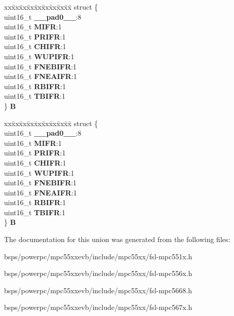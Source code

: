 \begin{DoxyCompactItemize}
\begin{tabbing}
\end{tabbing}\item 
\mbox{\label{unionuCIFRR_a86fedfe577f922746b60cefe7730cfbd}} 
\begin{tabbing}
xx\=xx\=xx\=xx\=xx\=xx\=xx\=xx\=xx\=\kill
struct \{\\
\>uint16\_t {\bfseries \_\_pad0\_\_}:8\\
\>uint16\_t {\bfseries MIFR}:1\\
\>uint16\_t {\bfseries PRIFR}:1\\
\>uint16\_t {\bfseries CHIFR}:1\\
\>uint16\_t {\bfseries WUPIFR}:1\\
\>uint16\_t {\bfseries FNEBIFR}:1\\
\>uint16\_t {\bfseries FNEAIFR}:1\\
\>uint16\_t {\bfseries RBIFR}:1\\
\>uint16\_t {\bfseries TBIFR}:1\\
\} {\bfseries B}\\

\end{tabbing}\item 
\mbox{\label{unionuCIFRR_ab73d3fa5284ac71effe21ab815520073}} 
\begin{tabbing}
xx\=xx\=xx\=xx\=xx\=xx\=xx\=xx\=xx\=\kill
struct \{\\
\>uint16\_t {\bfseries \_\_pad0\_\_}:8\\
\>uint16\_t {\bfseries MIFR}:1\\
\>uint16\_t {\bfseries PRIFR}:1\\
\>uint16\_t {\bfseries CHIFR}:1\\
\>uint16\_t {\bfseries WUPIFR}:1\\
\>uint16\_t {\bfseries FNEBIFR}:1\\
\>uint16\_t {\bfseries FNEAIFR}:1\\
\>uint16\_t {\bfseries RBIFR}:1\\
\>uint16\_t {\bfseries TBIFR}:1\\
\} {\bfseries B}\\

\end{tabbing}\end{DoxyCompactItemize}


The documentation for this union was generated from the following files\+:\begin{DoxyCompactItemize}
\item 
bsps/powerpc/mpc55xxevb/include/mpc55xx/fsl-\/mpc551x.\+h\item 
bsps/powerpc/mpc55xxevb/include/mpc55xx/fsl-\/mpc556x.\+h\item 
bsps/powerpc/mpc55xxevb/include/mpc55xx/fsl-\/mpc5668.\+h\item 
bsps/powerpc/mpc55xxevb/include/mpc55xx/fsl-\/mpc567x.\+h\end{DoxyCompactItemize}
